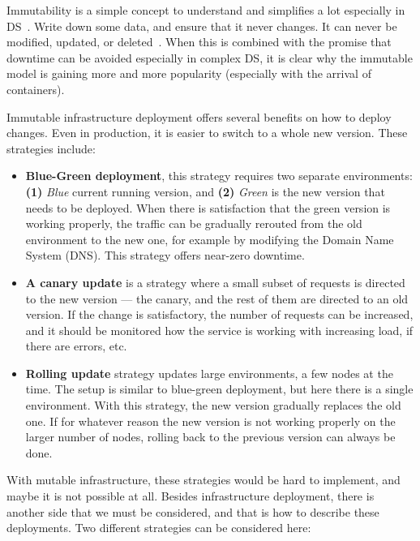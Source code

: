 Immutability is a simple concept to understand and simplifies a lot especially in DS~\cite{Helland16}. Write down some data, and ensure that it never changes. It can never be modified, updated, or deleted~\cite{perry2020art}. When this is combined with the promise that downtime can be avoided especially in complex DS, it is clear why the immutable model is gaining more and more popularity (especially with the arrival of containers). 

Immutable infrastructure deployment offers several benefits on how to deploy changes. Even in production, it is easier to switch to a whole new version. These strategies include:

\begin{itemize}
	\item \textbf{Blue-Green deployment}, this strategy requires two separate environments: \textbf{(1)} \textit{Blue} current running version, and \textbf{(2)} \textit{Green} is the new version that needs to be deployed. When there is satisfaction that the green version is working properly, the traffic can be gradually rerouted from the old environment to the new one,  for example by modifying the Domain Name System (DNS). This strategy offers near-zero downtime.
	\item \textbf{A canary update} is a strategy where a small subset of requests is directed to the new version --- the canary, and the rest of them are directed to an old version. If the change is satisfactory, the number of requests can be increased, and it should be monitored how the service is working with increasing load, if there are errors, etc.
	\item \textbf{Rolling update} strategy updates large environments, a few nodes at the time. The setup is similar to blue-green deployment, but here there is a single environment. With this strategy, the new version gradually replaces the old one. If for whatever reason the new version is not working properly on the larger number of nodes, rolling back to the previous version can always be done.
\end{itemize}

\noindent
With mutable infrastructure, these strategies would be hard to implement, and maybe it is not possible at all. Besides infrastructure deployment, there is another side that we must be considered, and that is how to describe these deployments. Two different strategies can be considered here:

